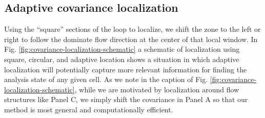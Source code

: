 \subsection*{Adaptive covariance localization}

Using the ``square'' sections of the loop to localize, we shift the zone to the left or right to follow the dominate flow direction at the center of that local window.
In Fig. \ref{fig:covariance-localization-schematic} a schematic of localization using square, circular, and adaptive location shows a situation in which adaptive localization will potentially capture more relevant information for finding the analysis state of any given cell.
As we note in the caption of Fig. \ref{fig:covariance-localization-schematic}, while we are motivated by localization around flow structures like Panel C, we simply shift the covariance in Panel A so that our method is most general and computationally efficient.


